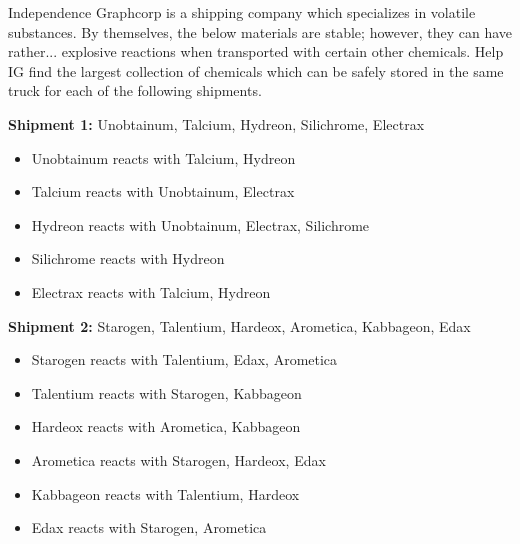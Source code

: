 
\begin{puzzle}
  Independence Graphcorp is a shipping company which specializes in volatile
  substances. By themselves, the below materials are stable; however,
  they can have rather... explosive reactions when transported with certain
  other chemicals. Help IG find the largest collection of chemicals which
  can be safely stored in the same truck for each of the following shipments.

  \begin{center}
  \end{center}

  \noindent
  \textbf{Shipment 1:} Unobtainum, Talcium, Hydreon, Silichrome, Electrax

  \begin{itemize}
    \item Unobtainum reacts with Talcium, Hydreon
    \item Talcium reacts with Unobtainum, Electrax
    \item Hydreon reacts with Unobtainum, Electrax, Silichrome
    \item Silichrome reacts with Hydreon
    \item Electrax reacts with Talcium, Hydreon
  \end{itemize}

  \noindent
  \textbf{Shipment 2:} Starogen, Talentium, Hardeox, Arometica, Kabbageon, Edax

  \begin{itemize}
    \item Starogen reacts with Talentium, Edax, Arometica
    \item Talentium reacts with Starogen, Kabbageon
    \item Hardeox reacts with Arometica, Kabbageon
    \item Arometica reacts with Starogen, Hardeox, Edax
    \item Kabbageon reacts with Talentium, Hardeox
    \item Edax reacts with Starogen, Arometica
  \end{itemize}



\end{puzzle}
